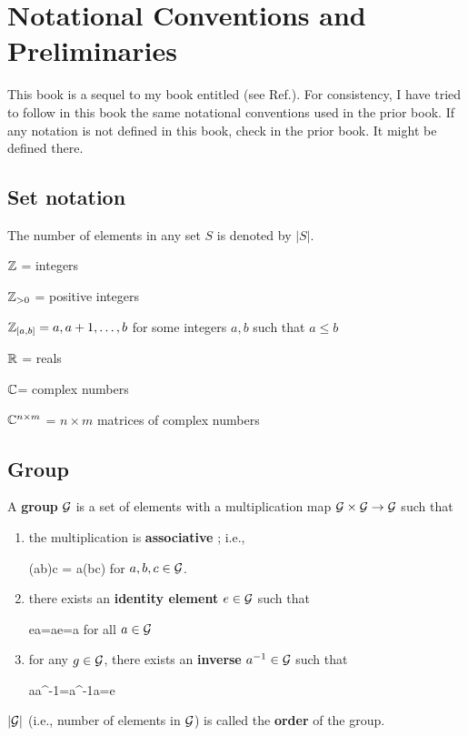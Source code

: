 \chapter{Notational Conventions and Preliminaries}
\label{ch-conventions}
This book is a sequel to
my book entitled 
(see Ref.\cite{bayesuvius}). 
For consistency, 
I have tried to follow in this book the 
same notational conventions
used in the prior book.
If any notation is not defined in this book,
check in the prior book. It might be
defined there.  

\section{Set notation}

The number of elements in any set $S$ is denoted by $|S|$.

${\mathbb{Z}}$ = integers

${\mathbb{Z}}_{>0}$ = positive integers

${\mathbb{Z}}_{[a,b]} = a, a+1, \ldots, b$
for some integers $a, b$ such that $a\leq b$

${ \mathbb{R}}$ = reals

${ \mathbb{C}}$= complex numbers

${ \mathbb{C}}^{n\times m}$ = $n\times m$ matrices of complex numbers

\section{Group}

A {\bf group}
${\cal G}$
is a set of elements
with a multiplication map ${\cal G}\times {\cal G}
\rightarrow {\cal G}$
such that


\begin{enumerate}
\item 
the multiplication is {\bf associative
}; i.e., 

\beq
(ab)c = a(bc)
\eeq
for $a,b,c\in{\cal G}$.

\item
there exists an {\bf identity element}
$e\in {\cal G}$
such that 

\beq
ea=ae=a
\eeq
for all $a\in {\cal G}$

\item
for any $g\in{\cal G}$,
there exists an {\bf inverse} $a^{-1}\in {\cal G}$ such that

\beq
aa^{-1}=a^{-1}a=e
\eeq
\end{enumerate}

$|{\cal G}|$ (i.e., number of
elements in ${\cal G}$)
is called the {\bf order}
of the group.


